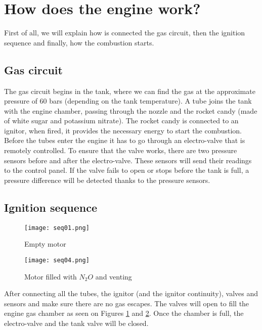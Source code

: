 
\section*{How does the engine work?}

First of all, we will explain how is connected the gas circuit, then the ignition sequence and finally, how the combustion starts.

\subsection*{Gas circuit}

The gas circuit begins in the tank, where we can find the gas at the approximate pressure of 60 bars (depending on the tank temperature). A tube joins the tank with the engine chamber, passing through the nozzle and the rocket candy (made of white sugar and potassium nitrate). The rocket candy is connected to an ignitor, when fired, it provides the necessary energy to start the combustion. Before the tubes enter the engine it has to go through an electro-valve that is remotely controlled. To ensure that the valve works, there are two pressure sensors before and after the electro-valve. These sensors will send their readings to the control panel. If the valve fails to open or stops before the tank is full, a pressure difference will be detected thanks to the pressure sensors.

\subsection*{Ignition sequence}

\begin{figure}[h]
  \centering
  \texttt{[image: seq01.png]}
  \caption{Empty motor}
  \label{fig:emptyMotor}
\end{figure}

\begin{figure}[h]
  \centering
  \texttt{[image: seq04.png]}
  \caption{Motor filled with $N_2O$ and venting}
  \label{fig:filledMotor}
\end{figure}

After connecting all the tubes, the ignitor (and the ignitor continuity), valves and sensors and make sure there are no gas escapes. The valves will open to fill the engine gas chamber as seen on Figures \ref{fig:emptyMotor} and \ref{fig:filledMotor}. Once the chamber is full, the electro-valve and the tank valve will be closed.

